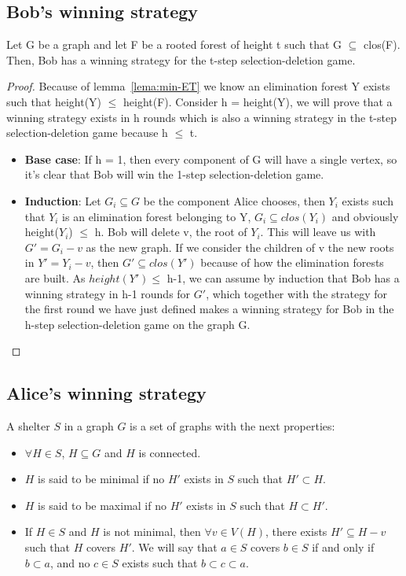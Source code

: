 \subsection{Bob's winning strategy}
\begin{lemma}
Let G be a graph and let F be a rooted forest of height t such that G $\subseteq$ clos(F). Then, Bob has a winning strategy for the t-step selection-deletion game.
\label{lemma:Bob-win}
\end{lemma}
\begin{proof}
Because of lemma~\ref{lema:min-ET} we know an elimination forest Y exists such that height(Y) $\leq$ height(F).
Consider h = height(Y), we will prove that a winning strategy exists in h rounds which is also a winning strategy in the t-step selection-deletion game because h $\leq$ t.
\begin{itemize}
  \item \textbf{Base case}: If h = 1, then every component of G will have a single vertex, so it's clear that Bob will win the 1-step selection-deletion game.
  \item \textbf{Induction}: Let $G_i \subseteq G$ be the component Alice chooses, then $Y_i$ exists such that $Y_i$ is an elimination forest belonging to Y, $G_i \subseteq clos(Y_i)$ and obviously height($Y_i$) $\leq$ h. Bob will delete v, the root of $Y_i$. This will leave us with $G' = G_i - v$ as the new graph. If we consider the children of v the new roots in $Y' = Y_i - v$, then $G' \subseteq clos(Y')$ because of how the elimination forests are built. As $height(Y') \leq$ h-1, we can assume by induction that Bob has a winning strategy in h-1 rounds for $G'$, which together with the strategy for the first round we have just defined makes a winning strategy for Bob in the h-step selection-deletion game on the graph G.
\end{itemize}
\end{proof}

\subsection{Alice's winning strategy}
\begin{definition}
A shelter $S$ in a graph $G$ is a set of graphs with the next properties:
\begin{itemize}
  \item $\forall H \in S$, $H \subseteq G$ and $H$ is connected.
  \item $H$ is said to be minimal if no $H'$ exists in $S$ such that $H' \subset H$.
  \item $H$ is said to be maximal if no $H'$ exists in $S$ such that $H \subset H'$.
  \item If $H \in S$ and $H$ is not minimal, then $\forall v \in V(H)$, there exists $H' \subseteq H - v$ such that $H$ covers $H'$. We will say that $a \in S$ covers $b \in S$ if and only if $b \subset a$, and no $c \in S$ exists such that $b \subset c \subset a$.
\end{itemize}
\end{definition}

